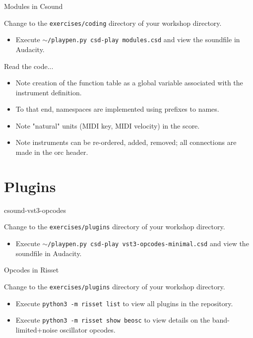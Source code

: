 \documentclass{beamer}
\begin{document}
\begin{frame}{Modules in Csound}
\begin{example}
Change to the \texttt{exercises/coding} directory of your workshop directory.
\begin{itemize}
\item Execute \texttt{$\sim$/playpen.py csd-play modules.csd} and view the soundfile in Audacity.
\end{itemize}
Read the code...
\begin{itemize}
\item Note creation of the function table as a global variable associated with the instrument definition.
\item To that end, namespaces are implemented using prefixes to names.
\item Note "natural" units (MIDI key, MIDI velocity) in the score.
\item Note instruments can be re-ordered, added, removed; all connections are made in the orc header.
\end{itemize}
\end{example}
\end{frame}

\section{Plugins}

\begin{frame}{csound-vst3-opcodes}
\begin{example}
Change to the \texttt{exercises/plugins} directory of your workshop directory.
\begin{itemize}
\item Execute \texttt{$\sim$/playpen.py csd-play vst3-opcodes-minimal.csd} and view the soundfile in Audacity.
\end{itemize}
\end{example}
\end{frame}

\begin{frame}{Opcodes in Risset}
\begin{example}
Change to the \texttt{exercises/plugins} directory of your workshop directory.
\begin{itemize}
\item Execute \texttt{python3 -m risset list} to view all plugins in the repository.
\item Execute \texttt{python3 -m risset show beosc} to view details on the band-limited+noise  oscillator opcodes.
\end{itemize}
\end{example}
\end{frame}
\end{document}

